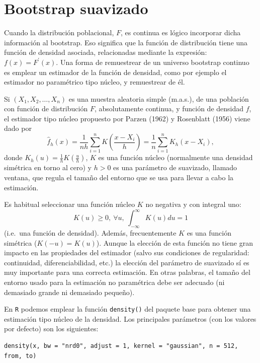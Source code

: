 \documentclass[
  10pt,
]{book}
\theoremstyle{break}
\theoremstyle{nonumberplain}
\begin{document}
\hypertarget{modunif-boot-suav}{%
\section{Bootstrap suavizado}\label{modunif-boot-suav}}

Cuando la distribución poblacional, \(F\), es continua es lógico incorporar dicha información al bootstrap.
Eso significa que la función de distribución tiene una función de densidad asociada, relacionadas mediante la expresión: \(f(x) =F^{\prime}(x)\).
Una forma de remuestrear de un universo bootstrap continuo es emplear un estimador de la función de densidad, como por ejemplo el estimador no paramétrico tipo núcleo, y remuestrear de él.

Si \(\left( X_1, X_2, \ldots, X_n \right)\) es una muestra aleatoria simple (m.a.s.), de una población con función de distribución \(F\), absolutamente continua, y función de densidad \(f\), el estimador tipo núcleo propuesto por Parzen (1962) y Rosenblatt (1956) viene dado por
\[\hat{f}_{h}\left( x \right) =\frac{1}{nh}\sum_{i=1}^{n}K\left( \frac{x-X_i}{h} \right) =\frac{1}{n}\sum_{i=1}^{n}K_{h}\left( x-X_i \right),\]
donde \(K_{h}\left( u \right) =\frac{1}{h}K\left( \frac{u}{h} \right)\), \(K\) es una función núcleo (normalmente una densidad simétrica en torno al cero) y \(h>0\) es una parámetro de suavizado, llamado ventana, que regula el tamaño del entorno que se usa para llevar a cabo la estimación.

Es habitual seleccionar una función núcleo \(K\) no negativa y con integral uno:
\[K\left( u \right) \geq 0,~\forall u,~\int_{-\infty }^{\infty }
K\left( u \right) du=1\]
(i.e.~una función de densidad).
Además, frecuentemente \(K\) es una función simétrica (\(K\left( -u \right) =K\left( u \right)\)).
Aunque la elección de esta función no tiene gran impacto en las propiedades del estimador (salvo sus condiciones de regularidad: continuidad, diferenciabilidad, etc.) la elección del parámetro de suavizado sí es muy importante para una correcta estimación.
En otras palabras, el tamaño del entorno usado para la estimación no paramétrica debe ser adecuado (ni demasiado grande ni demasiado pequeño).

En \texttt{R} podemos emplear la función \texttt{density()} del paquete base para obtener
una estimación tipo núcleo de la densidad.
Los principales parámetros (con los valores por defecto) son los siguientes:

\begin{verbatim}
density(x, bw = "nrd0", adjust = 1, kernel = "gaussian", n = 512, from, to)
\end{verbatim}
\end{document}
